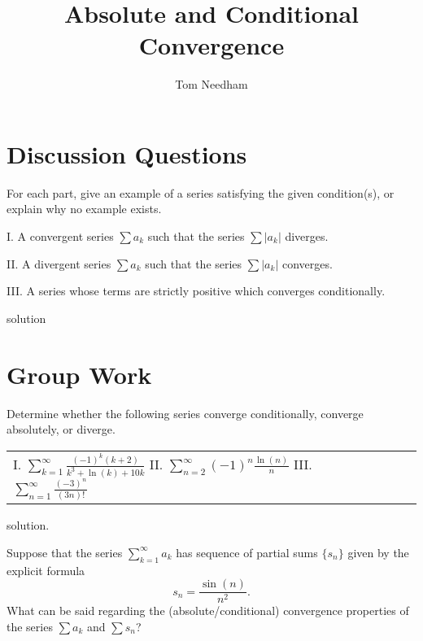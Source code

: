 \documentclass[handout]{ximera}
\author{Tom Needham}
\title[Collaborate:]{Absolute and Conditional Convergence}
\begin{document}
\begin{abstract}
\end{abstract}
\maketitle

\section{Discussion Questions}

\begin{problem}
For each part, give an example of a series satisfying the given condition(s), or explain why no example exists.

I. A convergent series $\sum a_k$ such that the series $\sum |a_k|$ diverges.

II. A divergent series $\sum a_k$ such that the series $\sum |a_k|$ converges.

III. A series whose terms are strictly positive which converges conditionally.
\begin{solution}
solution
\end{solution}
\end{problem}

\section{Group Work}

\begin{problem}
Determine whether the following series converge conditionally, converge absolutely, or diverge.

\begin{center}
\begin{tabular}{lll}
I. $\sum_{k=1}^\infty \frac{(-1)^k(k+2)}{k^3+\ln(k) +10k}$ \hspace{.2in} II. $\sum_{n=2}^\infty (-1)^{n} \frac{\ln(n)}{n}$\hspace{.2in} III. $\sum_{n=1}^\infty \frac{(-3)^n}{(3n)!}$
\end{tabular}
\end{center}
\begin{solution}
solution.
\end{solution}
\end{problem}

\begin{problem}
Suppose that the series $\sum_{k=1}^\infty a_k$ has sequence of partial sums $\{s_n\}$ given by the explicit formula
$$
s_n = \frac{\sin(n)}{n^2}.
$$
What can be said regarding the (absolute/conditional) convergence properties of the series $\sum a_k$ and $\sum s_n$?
\end{problem}
\end{document}
